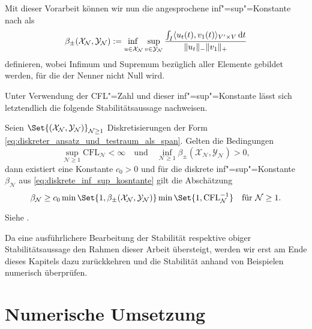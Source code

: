 \documentclass[../main.tex]{subfiles}
\begin{document}
Mit dieser Vorarbeit können wir nun die angesprochene inf"=sup"=Konstante nach \cite[57]{Andreev:2012ep} als
\begin{equation}
    \beta_{\pm}(\mathcal X_{\mathcal N}, \mathcal Y_{\mathcal N}) := \infsup{u \in \mathcal X_{\mathcal N}}{v \in \mathcal Y_{\mathcal N}} \frac{\int_{I} \skp{u_t(t)}{v_{1}(t)}{V' \times V} \diff t}{\norm{u_t}_{-} \norm{v_{1}}_{+}}
\end{equation}
definieren, wobei Infimum und Supremum bezüglich aller Elemente gebildet werden, für die der Nenner nicht Null wird.

Unter Verwendung der CFL"=Zahl und dieser inf"=sup"=Konstante lässt sich letztendlich die folgende Stabilitätsaussage nachweisen.

\begin{Satz}
    Seien $\Set{(\mathcal X_{\mathcal N}, \mathcal Y_{\mathcal N})}_{\mathcal N \geq 1}$ Diskretisierungen der Form \cref{eq:diskreter_ansatz_und_testraum_als_span}.
    Gelten die Bedingungen
    \begin{equation}
        \sup_{\mathcal N \geq 1} \mathrm{CFL}_{\mathcal N} < \infty
        \quad \text{und} \quad
        \inf_{\mathcal N \geq 1} \beta_{\pm}(\mathcal X_{\mathcal N}, \mathcal Y_{\mathcal N}) > 0,
    \end{equation}
    dann existiert eine Konstante $c_{0} > 0$ und für die diskrete inf"=sup"=Konstante $\beta_{\mathcal N}$ aus \cref{eq:diskrete_inf_sup_kosntante} gilt die Abschätzung
    \begin{equation}
        \beta_{\mathcal N} \geq c_{0} \min\Set{1, \beta_{\pm}(\mathcal X_{\mathcal N}, \mathcal Y_{\mathcal N})} \min\Set{1, \mathrm{CFL}_{\mathcal N}^{-1}} \quad \text{für } \mathcal N \geq 1.
    \end{equation}

    \begin{Beweis}
        Siehe \cite[Subsection 5.2.2]{Andreev:2012ep}.
    \end{Beweis}
\end{Satz}

Da eine ausführlichere Bearbeitung der Stabilität respektive obiger Stabilitätsaussage den Rahmen dieser Arbeit übersteigt, werden wir erst am Ende dieses Kapitels dazu zurückkehren und die Stabilität anhand von Beispielen numerisch überprüfen.


\section{Numerische Umsetzung} %
\label{section:galerkin_numerische_umsetzung}
\end{document}
